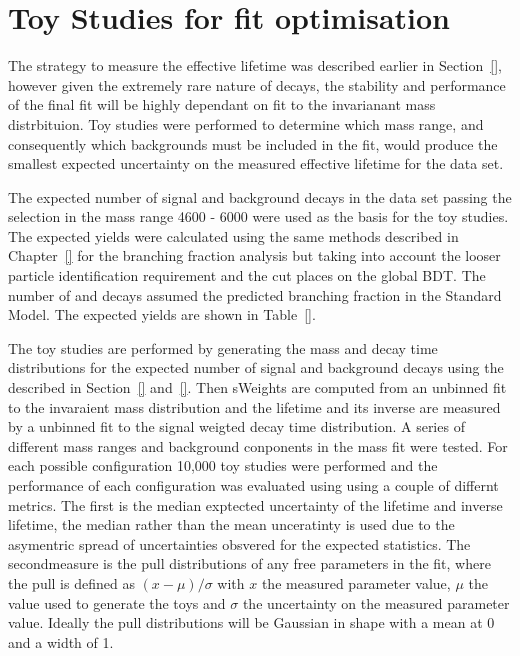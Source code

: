 {\section{Toy Studies for fit optimisation}
\label{sec:toys}
The strategy to measure the \bsmumu effective lifetime was described earlier in Section~\ref{}, however given the extremely rare nature of \bsmumu decays, the stability and performance of the final fit will be highly dependant on \ml fit to the invarianant mass distrbituion. Toy studies were performed to determine which mass range, and consequently which backgrounds must be included in the \ml fit, would produce the smallest expected uncertainty on the measured effective lifetime for the data set. 

The expected number of signal and background decays in the data set passing the \bsmumu selection in the mass range 4600 - 6000 \mevcc were used as the basis for the toy studies. The expected yields were calculated using the same methods described in Chapter~\ref{} for the \bmumu branching fraction analysis but taking into account the looser particle identification requirement and the cut places on the global BDT. The number of \bsmumu and \bdmumu decays assumed the predicted branching fraction in the Standard Model. The expected yields are shown in Table~\ref{}. 

The toy studies are performed by generating the mass and decay time distributions for the expected number of signal and background decays using the \pdfs described in Section~\ref{} and~\ref{}. Then sWeights are computed from an unbinned \ml fit to the invaraient mass distribution and the lifetime and its inverse are measured by a unbinned \ml fit to the signal weigted decay time distribution. A series of different mass ranges and background conponents in the mass fit were tested. For each possible configuration 10,000 toy studies were performed and the performance of each configuration was evaluated using using a couple of differnt metrics. The first is the median exptected uncertainty of the \bsmumu lifetime and inverse lifetime, the median rather than the mean unceratinty is used due to the asymentric spread of uncertainties obsvered for the expected statistics. The secondmeasure is the pull distributions of any free parameters in the fit, where the pull is defined as $(x - \mu)/\sigma$ with $x$ the measured parameter value, $\mu$ the value used to generate the toys and $\sigma$ the uncertainty on the measured parameter value. Ideally the pull distributions will be Gaussian in shape with a mean at 0 and a width of 1.

}
